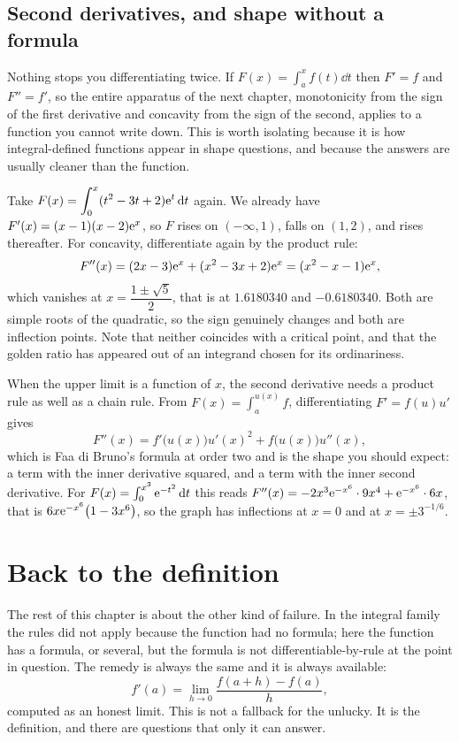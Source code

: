 \subsection{Second derivatives, and shape without a formula}

Nothing stops you differentiating twice. If $F(x)=\int_{a}^{x}f(t)\dd t$ then $F'=f$ and $F''=f'$, so the entire apparatus of the next chapter, monotonicity from the sign of the first derivative and concavity from the sign of the second, applies to a function you cannot write down. This is worth isolating because it is how integral-defined functions appear in shape questions, and because the answers are usually cleaner than the function.

Take $F(x)=\displaystyle\int_{0}^{x}(t^{2}-3t+2)\mathrm{e}^{t}\,\mathrm{d} t$ again. We already have $F'(x)=(x-1)(x-2)\mathrm{e}^{x}$, so $F$ rises on $(-\infty,1)$, falls on $(1,2)$, and rises thereafter. For concavity, differentiate again by the product rule:
\[
F''(x)=(2x-3)\mathrm{e}^{x}+(x^{2}-3x+2)\mathrm{e}^{x}=(x^{2}-x-1)\mathrm{e}^{x},
\]
which vanishes at $x=\dfrac{1\pm\sqrt5}{2}$, that is at $1.6180340$ and $-0.6180340$. Both are simple roots of the quadratic, so the sign genuinely changes and both are inflection points. Note that neither coincides with a critical point, and that the golden ratio has appeared out of an integrand chosen for its ordinariness.

When the upper limit is a function of $x$, the second derivative needs a product rule as well as a chain rule. From $F(x)=\int_{a}^{u(x)}f$, differentiating $F'=f(u)u'$ gives
\[
F''(x)=f'\bigl(u(x)\bigr)u'(x)^{2}+f\bigl(u(x)\bigr)u''(x),
\]
which is Faa di Bruno's formula at order two and is the shape you should expect: a term with the inner derivative squared, and a term with the inner second derivative. For $F(x)=\int_{0}^{x^{3}}\mathrm{e}^{-t^{2}}\,\mathrm{d} t$ this reads $F''(x)=-2x^{3}\mathrm{e}^{-x^{6}}\cdot9x^{4}+\mathrm{e}^{-x^{6}}\cdot6x$, that is $6x\mathrm{e}^{-x^{6}}\bigl(1-3x^{6}\bigr)$, so the graph has inflections at $x=0$ and at $x=\pm3^{-1/6}$.

\section{Back to the definition}

The rest of this chapter is about the other kind of failure. In the integral family the rules did not apply because the function had no formula; here the function has a formula, or several, but the formula is not differentiable-by-rule at the point in question. The remedy is always the same and it is always available:
\[
f'(a)=\lim_{h\to0}\frac{f(a+h)-f(a)}{h},
\]
computed as an honest limit. This is not a fallback for the unlucky. It is the definition, and there are questions that only it can answer.

